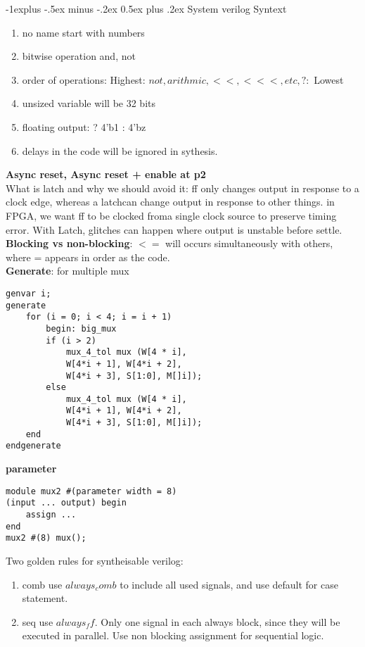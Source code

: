 \documentclass[10pt,landscape]{article}
\makeatletter
\renewcommand{\subsection}{\@startsection{subsection}{2}{0mm}%
                                {-1explus -.5ex minus -.2ex}%
                                {0.5ex plus .2ex}%
                                {\normalfont\normalsize\bfseries}}
\theoremstyle{definition}
\makeatother
\begin{document}
\begin{multicols}{3}
\subsection{System verilog Syntext}
\begin{enumerate}
    \item no name start with numbers
    \item bitwise operation and, not
    \item order of operations: Highest: $not, arithmic, <<, <<<, etc, ? :$ Lowest
    \item unsized variable will be 32 bits
    \item floating output: ? 4'b1 : 4'bz
    \item delays in the code will be ignored in sythesis. 
\end{enumerate}
\textbf{Async reset, Async reset + enable at p2}\\
What is latch and why we should avoid it: ff only changes output in response to a clock edge, whereas a latchcan change output in response to other things. in FPGA, we want ff to be clocked froma single clock source to preserve timing error. With Latch, glitches can happen where output is unstable before settle. \\

\textbf{Blocking vs non-blocking}: $<=$ will occurs simultaneously with others, where = appears in order as the code. \\
\textbf{Generate}: for multiple mux
\begin{lstlisting}[style={verilog-style}]
genvar i;
generate 
    for (i = 0; i < 4; i = i + 1) 
        begin: big_mux
        if (i > 2)
            mux_4_tol mux (W[4 * i], 
            W[4*i + 1], W[4*i + 2], 
            W[4*i + 3], S[1:0], M[]i]);
        else
            mux_4_tol mux (W[4 * i], 
            W[4*i + 1], W[4*i + 2], 
            W[4*i + 3], S[1:0], M[]i]);
    end
endgenerate
\end{lstlisting}

\textbf{parameter}
\begin{lstlisting}[style={verilog-style}]
module mux2 #(parameter width = 8) 
(input ... output) begin
    assign ...
end
mux2 #(8) mux();
\end{lstlisting}
Two golden rules for syntheisable verilog: 
\begin{enumerate}
    \item comb use $always_comb$ to include all used signals, and use default for case statement.
    \item seq use $always_ff$. Only one signal in each always block, since they will be executed in parallel. Use non blocking assignment for sequential logic. 
\end{enumerate}






\end{multicols}
\end{document}
